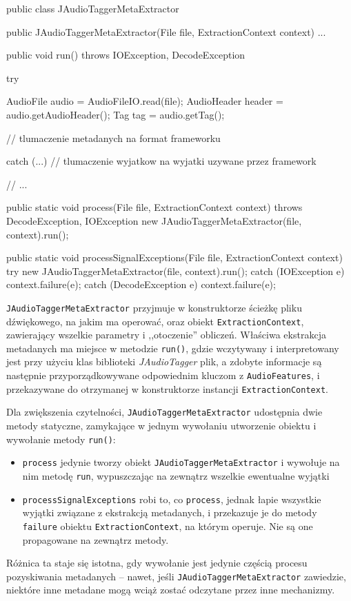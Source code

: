 \begin{java}
public class JAudioTaggerMetaExtractor {

    public JAudioTaggerMetaExtractor(File file, ExtractionContext context) { ... }

    public void run() throws IOException, DecodeException {
        try {
            AudioFile audio = AudioFileIO.read(file);
            AudioHeader header = audio.getAudioHeader();
            Tag tag = audio.getTag();

            // tlumaczenie metadanych na format frameworku
        } catch (...) {
            // tlumaczenie wyjatkow na wyjatki uzywane przez framework
        }
    }

    // ...

    public static void process(File file, ExtractionContext context) throws DecodeException, 
            IOException {
        new JAudioTaggerMetaExtractor(file, context).run();
    }

    public static void processSignalExceptions(File file, ExtractionContext context) {
        try {
            new JAudioTaggerMetaExtractor(file, context).run();
        } catch (IOException e) {
            context.failure(e);
        } catch (DecodeException e) {
            context.failure(e);
        }
    }
}
\end{java}


\texttt{JAudioTaggerMetaExtractor} przyjmuje w konstruktorze ścieżkę pliku dźwiękowego, na jakim ma
operować, oraz obiekt \texttt{ExtractionContext}, zawierający wszelkie parametry i ,,otoczenie''
obliczeń. Właściwa ekstrakcja metadanych ma miejsce w metodzie \texttt{run()}, gdzie wczytywany i
interpretowany jest przy użyciu klas biblioteki \emph{JAudioTagger} plik, a zdobyte informacje są
następnie przyporządkowywane odpowiednim kluczom z \texttt{AudioFeatures}, i przekazywane do
otrzymanej w konstruktorze instancji \texttt{ExtractionContext}.

Dla zwiększenia czytelności, \texttt{JAudioTaggerMetaExtractor} udostępnia dwie metody statyczne,
zamykające w jednym wywołaniu utworzenie obiektu i wywołanie metody \texttt{run()}:

\begin{itemize}

  \item \texttt{process} jedynie tworzy obiekt \texttt{JAudioTaggerMetaExtractor} i wywołuje na nim
metodę \texttt{run}, wypuszczając na zewnątrz wszelkie ewentualne wyjątki

  \item \texttt{processSignalExceptions} robi to, co \texttt{process}, jednak łapie wszystkie
wyjątki związane z ekstrakcją metadanych, i przekazuje je do metody \texttt{failure} obiektu
\texttt{ExtractionContext}, na którym operuje. Nie są one propagowane na zewnątrz metody.

\end{itemize}

Różnica ta staje się istotna, gdy wywołanie jest jedynie częścią procesu pozyskiwania metadanych --
nawet, jeśli \texttt{JAudioTaggerMetaExtractor} zawiedzie, niektóre inne metadane mogą wciąż zostać
odczytane przez inne mechanizmy. 
